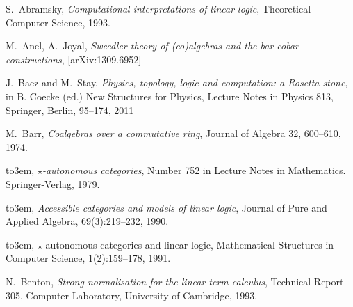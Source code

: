 \documentclass[english,letter paper,12pt,reqno]{article}
\theoremstyle{example}
\begin{document}

\providecommand{\bysame}{\leavevmode\hbox to3em{\hrulefill}\thinspace}
\providecommand{\href}[2]{#2}
\begin{thebibliography}{BHLS03}

S.~Abramsky, \textsl{Computational interpretations of linear logic}, Theoretical Computer Science, 1993.




M.~Anel, A.~Joyal, \textsl{Sweedler theory of (co)algebras and the bar-cobar constructions}, \href{http://arxiv.org/abs/1309.6952}{[arXiv:1309.6952]}


J.~Baez and M.~Stay, \textsl{Physics, topology, logic and computation: a Rosetta stone}, in B. Coecke (ed.) New Structures for Physics, Lecture Notes in Physics 813, Springer, Berlin, 95--174, 2011

M.~Barr, \textsl{Coalgebras over a commutative ring}, Journal of Algebra 32, 600--610, 1974.

\bysame, \textsl{$\star$-autonomous categories}, Number 752 in Lecture Notes in Mathematics. Springer-Verlag, 1979.

\bysame, \textsl{Accessible categories and models of linear logic}, Journal of Pure and Applied Algebra, 69(3):219--232, 1990.

\bysame, {$\star$-autonomous categories and linear logic}, Mathematical Structures in Computer Science, 1(2):159--178, 1991.


N.~Benton, \textsl{Strong normalisation for the linear term calculus}, Technical Report 305, Computer Laboratory, University of Cambridge, 1993.


\end{thebibliography}
\end{document}
